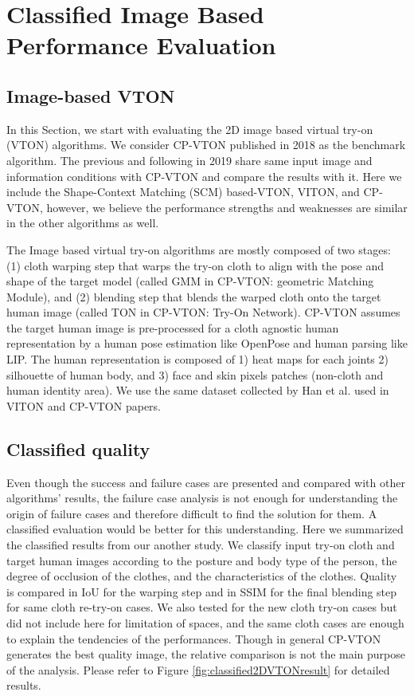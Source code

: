 \section{Classified Image Based Performance Evaluation}

\subsection{Image-based VTON}

In this Section, we start with evaluating the 2D image based virtual try-on (VTON) algorithms. We consider CP-VTON\cite{Wang2018TowardCI} published in 2018 as the benchmark algorithm. The previous and following in 2019 share same input image and information conditions with CP-VTON and compare the results with it. Here we include the Shape-Context Matching (SCM) based-VTON, VITON\cite{Han2017VITONAI}, and  CP-VTON\cite{Wang2018TowardCI}, however, we believe the performance strengths and weaknesses are similar in the other algorithms as well.


The Image based virtual try-on algorithms are mostly composed of two stages: (1) cloth warping step that warps the try-on cloth to align with the pose and shape of the target model (called GMM in CP-VTON: geometric Matching Module)\cite{Wang2018TowardCI}, and (2) blending step that blends the warped cloth onto the target human image (called TON in CP-VTON: Try-On Network)\cite{Wang2018TowardCI}. CP-VTON assumes the target human image is pre-processed for a cloth agnostic human representation by a human pose estimation like OpenPose\cite{Cao2018OpenPoseRM} and human parsing like LIP\cite{Liang2018LookIP}. The human representation is composed of 1) heat maps for each joints 2) silhouette of human body, and 3) face and skin pixels patches (non-cloth and human identity area). We use the same dataset collected by Han et al. used in VITON\cite{Han2017VITONAI} and CP-VTON\cite{Wang2018TowardCI} papers.
 

\subsection{Classified quality}

Even though the success and failure cases are presented and compared with other algorithms' results, the failure case analysis is not enough for understanding the origin of failure cases and therefore difficult to find the solution for them. A classified evaluation would be better for this understanding. Here we summarized the classified results from our another study. We classify input try-on cloth and target human images according to the posture and body type of the person, the degree of occlusion of the clothes, and the characteristics of the clothes. Quality is compared in IoU for the warping step and in SSIM for the final blending step for same cloth re-try-on cases. We also tested for the new cloth try-on cases but did not include here for limitation of spaces, and the same cloth cases are enough to explain the tendencies of the performances. Though in general CP-VTON generates the best quality image, the relative comparison is not the main purpose of the analysis. Please refer to Figure \ref{fig:classified2DVTONresult} for detailed results.


